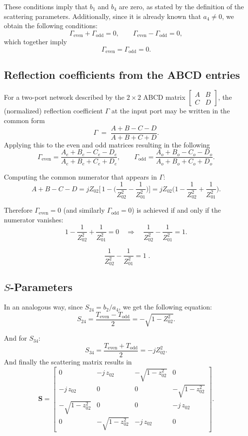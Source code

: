 \documentclass[a4paper,11pt]{article}
\begin{document}
These conditions imply that \(b_1\) and \(b_4\) are zero, as stated by the definition of the scattering parameters.
Additionally, since it is already known that \(a_4 \neq 0\), we obtain the following conditions:
\[
\Gamma_{\text{even}} + \Gamma_{\text{odd}} = 0,
\qquad
\Gamma_{\text{even}} - \Gamma_{\text{odd}} = 0,
\]
which together imply
\[
\Gamma_{\text{even}} = \Gamma_{\text{odd}} = 0.
\]

\subsection*{Reflection coefficients from the ABCD entries}

For a two-port network described by the \(2\times2\) ABCD matrix
\(\begin{bmatrix}A & B\\[2pt] C & D\end{bmatrix}\),
the (normalized) reflection coefficient \(\Gamma\) at the input port may be written in the common form
\[
\Gamma \;=\; \frac{A + B - C - D}{A + B + C + D}.
\]
Applying this to the even and odd matrices resulting in the following  
\[
\Gamma_{\text{even}}
=\frac{A_{e}+B_{e}-C_{e}-D_{e}}{A_{e}+B_{e}+C_{e}+D_{e}},\qquad
\Gamma_{\text{odd}}
=\frac{A_{o}+B_{o}-C_{o}-D_{o}}{A_{o}+B_{o}+C_{o}+D_{o}}.
\]


Computing the common numerator that appears in \(\Gamma\):
\[
A+B-C-D
= jZ_{02}\Big[\,1 -\Big(\dfrac{1}{Z_{02}^{2}}-\dfrac{1}{Z_{01}^{2}}\Big)\Big]
= jZ_{02}\Big(1-\dfrac{1}{Z_{02}^{2}}+\dfrac{1}{Z_{01}^{2}}\Big).
\]

Therefore \(\Gamma_{\text{even}}=0\) (and similarly \(\Gamma_{\text{odd}}=0\)) is achieved if and only if the numerator vanishes:
\[
1-\dfrac{1}{Z_{02}^{2}}+\dfrac{1}{Z_{01}^{2}} = 0
\quad\Longrightarrow\quad
\dfrac{1}{Z_{02}^{2}}-\dfrac{1}{Z_{01}^{2}} = 1.
\]

\[
\boxed{\;\dfrac{1}{Z_{02}^{2}}-\dfrac{1}{Z_{01}^{2}} = 1\; }.
\]

\subsection*{$S$-Parameters}

In an analogous way, since $S_{24} = b_2 / a_4$, we get the following equation:
\[
S_{24} = \frac{T_{\text{even}} - T_{\text{odd}}}{2} = -\sqrt{1 - Z_{02}^{2}}.
\]

And for $S_{34}$:
\[
S_{34} = \frac{T_{\text{even}} + T_{\text{odd}}}{2} = -j Z_{02}^{2}.
\]
And finally the scattering matrix results in
\[
\mathbf{S} =
\begin{bmatrix}
0 & -j\,z_{02} & -\sqrt{1-z_{02}^2} & 0 \\[2mm]
-j\,z_{02} & 0 & 0 & -\sqrt{1-z_{02}^2} \\[1mm]
-\sqrt{1-z_{02}^2} & 0 & 0 & -j\,z_{02} \\[1mm]
0 & -\sqrt{1-z_{02}^2} & -j\,z_{02} & 0
\end{bmatrix}.
\]
\end{document}
